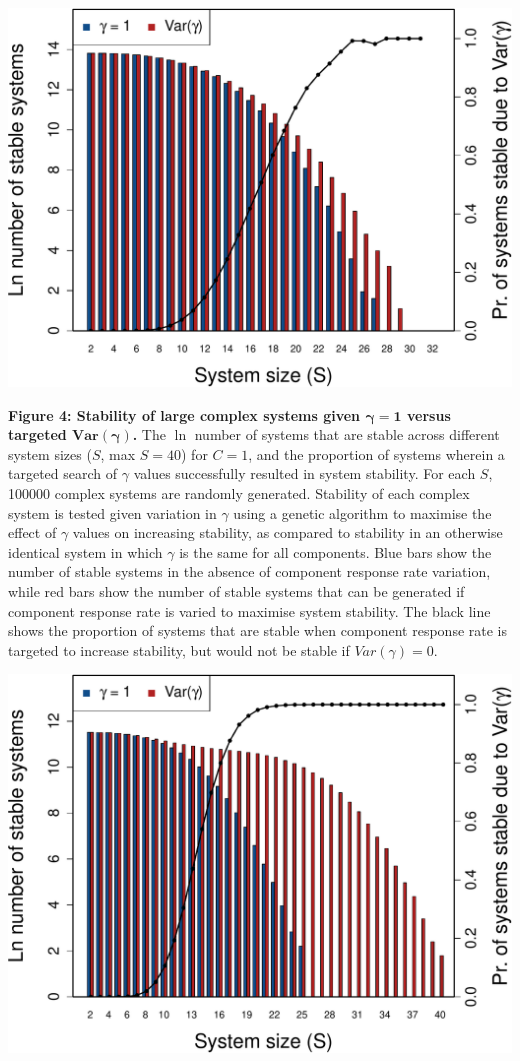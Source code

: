 \documentclass[]{article}
\begin{document}
\includegraphics{ms_files/figure-latex/unnamed-chunk-15-1.pdf}

\clearpage

\textbf{Figure 4: Stability of large complex systems given
\(\boldsymbol{\gamma = 1}\) versus targeted
\(\boldsymbol{Var(\gamma)}\).} The \(\ln\) number of systems that are
stable across different system sizes (\(S\), max \(S=40\)) for
\(C = 1\), and the proportion of systems wherein a targeted search of
\(\gamma\) values successfully resulted in system stability. For each
\(S\), 100000 complex systems are randomly generated. Stability of each
complex system is tested given variation in \(\gamma\) using a genetic
algorithm to maximise the effect of \(\gamma\) values on increasing
stability, as compared to stability in an otherwise identical system in
which \(\gamma\) is the same for all components. Blue bars show the
number of stable systems in the absence of component response rate
variation, while red bars show the number of stable systems that can be
generated if component response rate is varied to maximise system
stability. The black line shows the proportion of systems that are
stable when component response rate is targeted to increase stability,
but would not be stable if \(Var(\gamma) = 0\).

\includegraphics{ms_files/figure-latex/unnamed-chunk-16-1.pdf}
\end{document}
